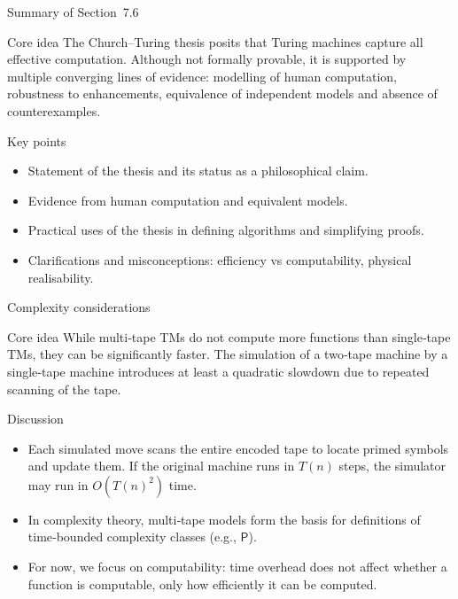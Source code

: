 \begin{frame}[t]{Summary of Section 7.6}
  \begin{tblock}{Core idea}
    The Church–Turing thesis posits that Turing machines capture all
    effective computation.  Although not formally provable, it is
    supported by multiple converging lines of evidence: modelling of
    human computation, robustness to enhancements, equivalence of
    independent models and absence of counterexamples.
  \end{tblock}
  \begin{tblock}{Key points}
    \begin{itemize}
      \item Statement of the thesis and its status as a philosophical
        claim.
      \item Evidence from human computation and equivalent models.
      \item Practical uses of the thesis in defining algorithms and
        simplifying proofs.
      \item Clarifications and misconceptions: efficiency vs
        computability, physical realisability.
    \end{itemize}
  \end{tblock}
  \label{fr:7.6-09}
\end{frame}

\begin{frame}[t]{Complexity considerations}
  \begin{tblock}{Core idea}
    While multi‑tape TMs do not compute more functions than single‑tape
    TMs, they can be significantly faster.  The simulation of a
    two‑tape machine by a single‑tape machine introduces at least a
    quadratic slowdown due to repeated scanning of the tape.
  \end{tblock}
  \begin{tblock}{Discussion}
    \begin{itemize}
      \item Each simulated move scans the entire encoded tape to
        locate primed symbols and update them.  If the original
        machine runs in $T(n)$ steps, the simulator may run in
        $O(T(n)^2)$ time.
      \item In complexity theory, multi‑tape models form the basis for
        definitions of time‑bounded complexity classes (e.g., $\mathsf{P}$).
      \item For now, we focus on computability: time overhead does not
        affect whether a function is computable, only how efficiently it
        can be computed.
    \end{itemize}
  \end{tblock}
  \label{fr:7.5-14}
\end{frame}

